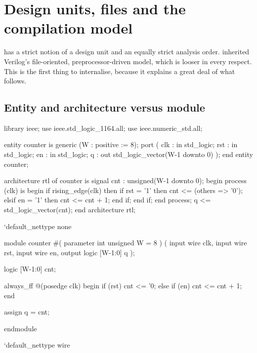 \section{Design units, files and the compilation model}
\label{sec:rosetta:units}

\VHDL{} has a strict notion of a design unit and an equally strict analysis
order. \SV{} inherited Verilog's file-oriented, preprocessor-driven model,
which is looser in every respect. This is the first thing to internalise,
because it explains a great deal of what follows.


\subsection{Entity and architecture versus module}

\begin{rosetta}
\begin{rleft}
library ieee;
use ieee.std_logic_1164.all;
use ieee.numeric_std.all;

entity counter is
  generic (W : positive := 8);
  port (
    clk : in  std_logic;
    rst : in  std_logic;
    en  : in  std_logic;
    q   : out std_logic_vector(W-1 downto 0)
  );
end entity counter;

architecture rtl of counter is
  signal cnt : unsigned(W-1 downto 0);
begin
  process (clk) is
  begin
    if rising_edge(clk) then
      if rst = '1' then
        cnt <= (others => '0');
      elsif en = '1' then
        cnt <= cnt + 1;
      end if;
    end if;
  end process;
  q <= std_logic_vector(cnt);
end architecture rtl;
\end{rleft}
\begin{rright}
`default_nettype none

module counter #(
  parameter int unsigned W = 8
) (
  input  wire              clk,
  input  wire              rst,
  input  wire              en,
  output logic [W-1:0]     q
);

  logic [W-1:0] cnt;

  always_ff @(posedge clk) begin
    if (rst)      cnt <= '0;
    else if (en)  cnt <= cnt + 1;
  end

  assign q = cnt;

endmodule

`default_nettype wire
\end{rright}
\end{rosetta}

